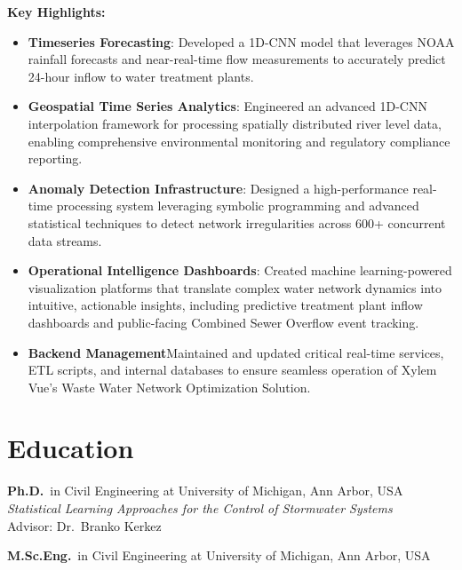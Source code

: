 \documentclass[a4paper,11pt]{article}
\newcommand{\years}[1]{%
  {\reversemarginpar\strut\marginnote{{\small#1}}}%
}
\begin{document}
\vspace{2mm}
{\small \textbf{Key Highlights:}}
\vspace{-2mm}
\begin{itemize}
	\setlength\itemsep{1mm}
	\item \textbf{Timeseries Forecasting}: Developed a 1D-CNN model that leverages NOAA rainfall forecasts and near-real-time flow measurements to accurately predict 24-hour inflow to water treatment plants.
	\item \textbf{Geospatial Time Series Analytics}: Engineered an advanced 1D-CNN interpolation framework for processing spatially distributed river level data, enabling comprehensive environmental monitoring and regulatory compliance reporting.
	\item \textbf{Anomaly Detection Infrastructure}: Designed a high-performance real-time processing system leveraging symbolic programming and advanced statistical techniques to detect network irregularities across 600+ concurrent data streams.
	\item \textbf{Operational Intelligence Dashboards}: Created machine learning-powered visualization platforms that translate complex water network dynamics into intuitive, actionable insights, including predictive treatment plant inflow dashboards and public-facing Combined Sewer Overflow event tracking.
	\item \textbf{Backend Management}Maintained and updated critical real-time services, ETL scripts, and internal databases to ensure seamless operation of Xylem Vue's Waste Water Network Optimization Solution.
\end{itemize}

\section*{Education}

\years{2017--2020}%
\textbf{Ph.D.}\ in Civil Engineering at University of Michigan, Ann Arbor, USA\\[.1cm]
\noindent \emph{Statistical Learning Approaches for the Control of Stormwater Systems}\\
Advisor: Dr.\ Branko Kerkez\\[.1cm]

\years{2015--2017}%
\textbf{M.Sc.Eng.}\ in Civil Engineering at University of Michigan, Ann Arbor, USA\\[.1cm]
\end{document}
